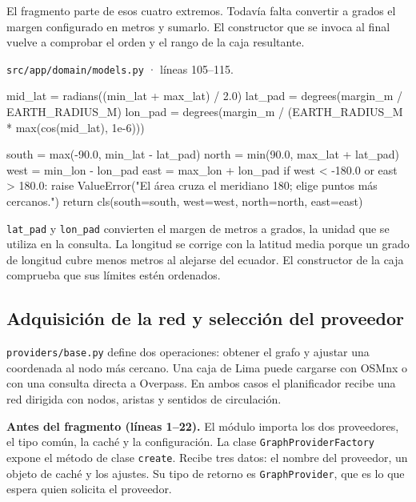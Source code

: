 \documentclass[11pt,a4paper]{article}
\begin{document}
El fragmento parte de esos cuatro extremos. Todavía falta convertir a grados el margen configurado en metros y sumarlo. El constructor que se invoca al final vuelve a comprobar el orden y el rango de la caja resultante.

\par\medskip
\noindent\begin{minipage}{\linewidth}
{\footnotesize\nolinkurl{src/app/domain/models.py} · líneas 105--115.\par}
\nopagebreak[4]
\begin{Codigo}[firstnumber=105]
        mid_lat = radians((min_lat + max_lat) / 2.0)
        lat_pad = degrees(margin_m / EARTH_RADIUS_M)
        lon_pad = degrees(margin_m / (EARTH_RADIUS_M * max(cos(mid_lat), 1e-6)))

        south = max(-90.0, min_lat - lat_pad)
        north = min(90.0, max_lat + lat_pad)
        west = min_lon - lon_pad
        east = max_lon + lon_pad
        if west < -180.0 or east > 180.0:
            raise ValueError("El área cruza el meridiano 180; elige puntos más cercanos.")
        return cls(south=south, west=west, north=north, east=east)
\end{Codigo}
\end{minipage}\par

\texttt{lat\_pad} y \texttt{lon\_pad} convierten el margen de metros a grados, la unidad que se utiliza en la consulta. La longitud se corrige con la latitud media porque un grado de longitud cubre menos metros al alejarse del ecuador. El constructor de la caja comprueba que sus límites estén ordenados.

\clearpage
\subsection{Adquisición de la red y selección del proveedor}

\texttt{providers/base.py} define dos operaciones: obtener el grafo y ajustar una coordenada al nodo más cercano. Una caja de Lima puede cargarse con OSMnx o con una consulta directa a Overpass. En ambos casos el planificador recibe una red dirigida con nodos, aristas y sentidos de circulación.

\textbf{Antes del fragmento (líneas 1--22).} El módulo importa los dos proveedores, el tipo común, la caché y la configuración. La clase \texttt{GraphProviderFactory} expone el método de clase \texttt{create}. Recibe tres datos: el nombre del proveedor, un objeto de caché y los ajustes. Su tipo de retorno es \texttt{GraphProvider}, que es lo que espera quien solicita el proveedor.
\end{document}

